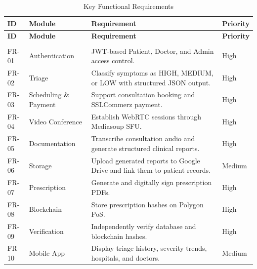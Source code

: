 \vspace{3mm}
{
\renewcommand{\arraystretch}{1.3}
\begin{xltabular}{\textwidth}{|>{\centering\arraybackslash}p{1.0cm}|>{\raggedright\arraybackslash}p{3.0cm}|>{\raggedright\arraybackslash}X|>{\centering\arraybackslash}p{1.5cm}|}

\hline
\textbf{ID} & \textbf{Module} & \textbf{Requirement} & \textbf{Priority} \\
\hline
\endfirsthead

\hline
\textbf{ID} & \textbf{Module} & \textbf{Requirement} & \textbf{Priority} \\
\hline
\endhead


\hline
\caption{Key Functional Requirements} \label{tab:funcreq} \\
\endlastfoot


FR-01 & Authentication & JWT-based Patient, Doctor, and Admin access control. & High \\
\hline
FR-02 & Triage & Classify symptoms as HIGH, MEDIUM, or LOW with structured JSON output. & High \\
\hline
FR-03 & Scheduling \& Payment & Support consultation booking and SSLCommerz payment. & High \\
\hline
FR-04 & Video Conference & Establish WebRTC sessions through Mediasoup SFU. & High \\
\hline
FR-05 & Documentation & Transcribe consultation audio and generate structured clinical reports. & High \\
\hline
FR-06 & Storage & Upload generated reports to Google Drive and link them to patient records. & Medium \\
\hline
FR-07 & Prescription & Generate and digitally sign prescription PDFs. & High \\
\hline
FR-08 & Blockchain & Store prescription hashes on Polygon PoS. & High \\
\hline
FR-09 & Verification & Independently verify database and blockchain hashes. & High \\
\hline
FR-10 & Mobile App & Display triage history, severity trends, hospitals, and doctors. & Medium \\
\hline

\end{xltabular}
}

\vspace{5mm}

